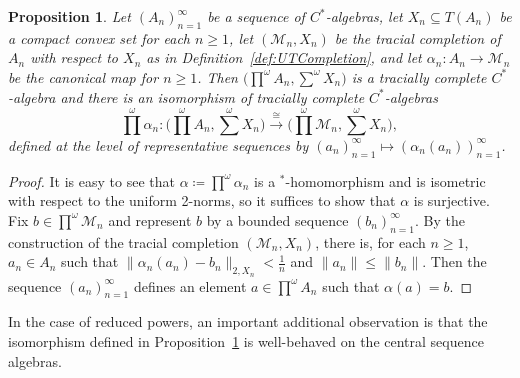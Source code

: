 \documentclass[a4paper,11pt]{amsart}
\newtheorem{proposition}[theorem]{Proposition}
\theoremstyle{definition}
\numberwithin{equation}{section}
\numberwithin{theorem}{section}
\newcommand{\M}{\mathcal{M}}
\begin{document}
\begin{proposition}\label{prop:CStarVsTCreducedProducts}
Let $(A_n)_{n=1}^\infty$ be a sequence of $C^*$-algebras, let $X_n \subseteq T(A_n)$ be a compact convex set for each $n \geq 1$, let $(\M_n, X_n)$ be the tracial completion of $A_n$ with respect to $X_n$ as in Definition~\ref{def:UTCompletion}, and let $\alpha_n \colon A_n \rightarrow \M_n$ be the canonical map for $n \geq 1$.  Then $\big(\prod^\omega A_n, \sum^\omega X_n\big)$ is a tracially complete $C^*$-algebra and there is an isomorphism of tracially complete $C^*$-algebras
\begin{equation}
  \prod^\omega \alpha_n \colon \Big( \prod^\omega A_n, \sum^\omega X_n \Big) 
  \overset\cong\longrightarrow \Big( \prod^\omega \M_n, \sum^\omega X_n \Big),
\end{equation}
defined at the level of representative sequences by $(a_n)_{n=1}^\infty  \mapsto (\alpha_n(a_n))_{n=1}^\infty$.
\end{proposition}
\begin{proof}
It is easy to see that $\alpha \coloneqq \prod^\omega \alpha_n$ is a $^*$-homomorphism and is isometric with respect to the uniform 2-norms, so it suffices to show that $\alpha$ is surjective.  Fix $b \in \prod^\omega \mathcal M_n$ and represent $b$ by a bounded sequence $(b_n)_{n=1}^\infty$.  By the construction of the tracial completion $(\M_n, X_n)$, there is, for each $n \geq 1$, $a_n \in A_n$ such that $\| \alpha_n(a_n) - b_n\|_{2, X_n} < \frac1n$ and $\|a_n\| \leq \|b_n\|$.  Then the sequence $(a_n)_{n=1}^\infty$ defines an element $a \in \prod^\omega A_n$ such that $\alpha(a) = b$.
\end{proof}

In the case of reduced powers, an important additional observation is that the isomorphism defined in Proposition~\ref{prop:CStarVsTCreducedProducts} is well-behaved on the central sequence algebras. 
\end{document}
